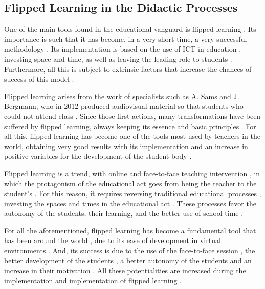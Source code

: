 \documentclass{textolivre}
\begin{document}
\subsection{Flipped Learning in the Didactic Processes}
One of the main tools found in the educational vanguard is flipped learning \cite{sanchez2019}. Its importance is such that it has become, in a very short time, a very successful methodology \cite{seery2015, zainuddin2019}. Its implementation is based on the use of ICT in education \cite{lopezbelmonte+pozosanchez+fuentescabrera+lopeznunez2019}, %
investing space and time, as well as leaving the leading role to students \cite{froehlich2018, mclaughlin2014}. Furthermore, all this is subject to extrinsic factors that increase the chances of success of this model \cite{mengualandres+lopezbelmonte+fuentescabrera+pozosanchez+2020}. %

Flipped learning arises from the work of specialists such as A. Sams and J. Bergmann, who in 2012 produced audiovisual material so that students who could not attend class \cite{bergmann2012}. Since those first actions, many transformations have been suffered by flipped learning, always keeping its essence and basic principles \cite{sola2019}. For all this, flipped learning has become one of the tools most used by teachers in the world, obtaining very good results with its implementation \cite{awidi2019, yoshida2015} and an increase in positive variables for the development of the student body \cite{fuentescabrera2020}. %

Flipped learning is a trend, with online and face-to-face teaching intervention \cite{lee2017, nortvig2018}, in which the protagonism of the educational act goes from being the teacher to the student's \cite{jensen2018, kwan2017}. %
For this reason, it requires reversing traditional educational processes \cite{bauer2016}, investing the spaces and times in the educational act \cite{lopezbelmonte+morenoguerrero+lopeznunes+pozosanchez2019}. %
These processes favor the autonomy of the students, their learning, and the better use of school time \cite{abeysekera2014, borao2016, longcummins2017, schmidt2016}.

For all the aforementioned, flipped learning has become a fundamental tool that has been around the world \cite{pozosanchez-lopezbelmonte-morenoguerrero-solareche-fuentes2020}, %
due to its ease of development in virtual environments \cite{nouri2016, zainuddin2016}. And, its success is due to the use of the face-to-face session \cite{baez2019, castellanos2017, hwang2015}, the better development of the students \cite{bognar2019, longlogan2016}, a better autonomy of the students \cite{salas2019, touron2015} and an increase in their motivation \cite{shih2017, tse2019}. All these potentialities are increased during the implementation and implementation of flipped learning \cite{fisher2017, karabulut2018}.
\end{document}
